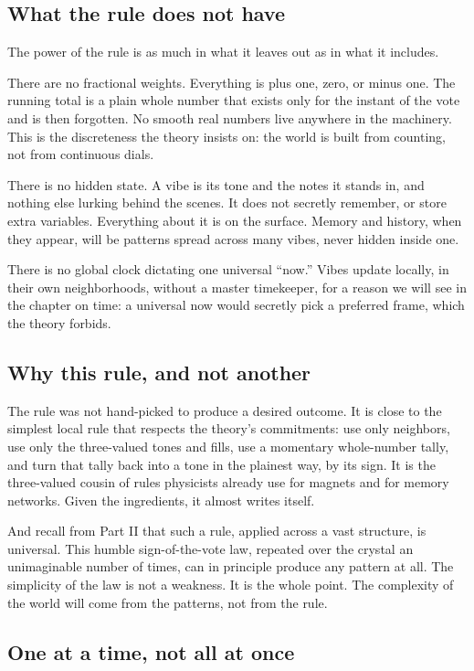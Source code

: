 \subsection{What the rule does not have}

The power of the rule is as much in what it leaves out as in what it includes.

There are no fractional weights. Everything is plus one, zero, or minus one. The running total is a plain whole number that exists only for the instant of the vote and is then forgotten. No smooth real numbers live anywhere in the machinery. This is the discreteness the theory insists on: the world is built from counting, not from continuous dials.

There is no hidden state. A vibe is its tone and the notes it stands in, and nothing else lurking behind the scenes. It does not secretly remember, or store extra variables. Everything about it is on the surface. Memory and history, when they appear, will be patterns spread across many vibes, never hidden inside one.

There is no global clock dictating one universal ``now.'' Vibes update locally, in their own neighborhoods, without a master timekeeper, for a reason we will see in the chapter on time: a universal now would secretly pick a preferred frame, which the theory forbids.

\subsection{Why this rule, and not another}

The rule was not hand-picked to produce a desired outcome. It is close to the simplest local rule that respects the theory's commitments: use only neighbors, use only the three-valued tones and fills, use a momentary whole-number tally, and turn that tally back into a tone in the plainest way, by its sign. It is the three-valued cousin of rules physicists already use for magnets and for memory networks. Given the ingredients, it almost writes itself.

And recall from Part II that such a rule, applied across a vast structure, is universal. This humble sign-of-the-vote law, repeated over the crystal an unimaginable number of times, can in principle produce any pattern at all. The simplicity of the law is not a weakness. It is the whole point. The complexity of the world will come from the patterns, not from the rule.

\subsection{One at a time, not all at once}

